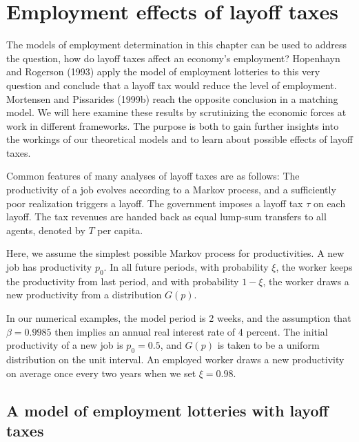 \section{Employment effects of layoff taxes}

The models of employment determination in this chapter can be
used to address the question, how do layoff taxes affect an
economy's employment? Hopenhayn and Rogerson (1993)
%
apply the model of employment lotteries to this very question
and conclude that a layoff tax would reduce the level
of employment. Mortensen and Pissarides (1999b) reach the opposite
conclusion in a matching model.
We will here examine these results by
scrutinizing the economic forces at work in different
frameworks. The purpose is both to
gain further insights into the workings of our theoretical
models and to learn about possible effects of layoff
taxes.

Common features of many analyses of layoff taxes
are as follows: The productivity of a job evolves
according to a Markov process, and a sufficiently poor
realization triggers a layoff. The government imposes
a layoff tax $\tau$ on each layoff. The tax revenues
are handed back as equal lump-sum transfers to all
agents, denoted by $T$ per capita.

Here, we assume the simplest possible Markov process
for productivities. A new job has productivity $p_0$.
In all future periods, with
probability $\xi$, the worker keeps the productivity
from last period, and with probability $1-\xi$,
the worker draws a new
productivity from a distribution $G(p)$.

In our numerical examples, the model period is 2 weeks,
and the assumption that $\beta=0.9985$ then implies an
annual real interest rate of 4 percent. The initial productivity
of a new job is $p_0=0.5$, and $G(p)$ is taken to be
a uniform distribution on the unit interval. An
employed worker draws a new productivity on average
once every two years when we set $\xi =0.98$.
\subsection{A model of employment lotteries with layoff taxes}

